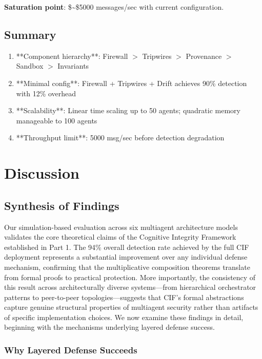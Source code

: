 \documentclass[
]{article}
\begin{document}
\textbf{Saturation point}: \$\sim\$5000 messages/sec with current
configuration.

\subsection{Summary}\label{sec:ablation-summary}

\begin{enumerate}
\item **Component hierarchy**: Firewall $>$ Tripwires $>$ Provenance $>$ Sandbox $>$ Invariants
\item **Minimal config**: Firewall + Tripwires + Drift achieves 90\% detection with 12\% overhead
\item **Scalability**: Linear time scaling up to 50 agents; quadratic memory manageable to 100 agents
\item **Throughput limit**: 5000 msg/sec before detection degradation
\end{enumerate}

\newpage

\newpage

\section{Discussion}\label{sec:discussion}

\subsection{Synthesis of Findings}\label{synthesis-of-findings}

Our simulation-based evaluation across six multiagent architecture
models validates the core theoretical claims of the Cognitive Integrity
Framework established in Part 1. The 94\% overall detection rate
achieved by the full CIF deployment represents a substantial improvement
over any individual defense mechanism, confirming that the
multiplicative composition theorems translate from formal proofs to
practical protection. More importantly, the consistency of this result
across architecturally diverse systems---from hierarchical orchestrator
patterns to peer-to-peer topologies---suggests that CIF's formal
abstractions capture genuine structural properties of multiagent
security rather than artifacts of specific implementation choices. We
now examine these findings in detail, beginning with the mechanisms
underlying layered defense success.

\subsubsection{Why Layered Defense
Succeeds}\label{why-layered-defense-succeeds}
\end{document}
